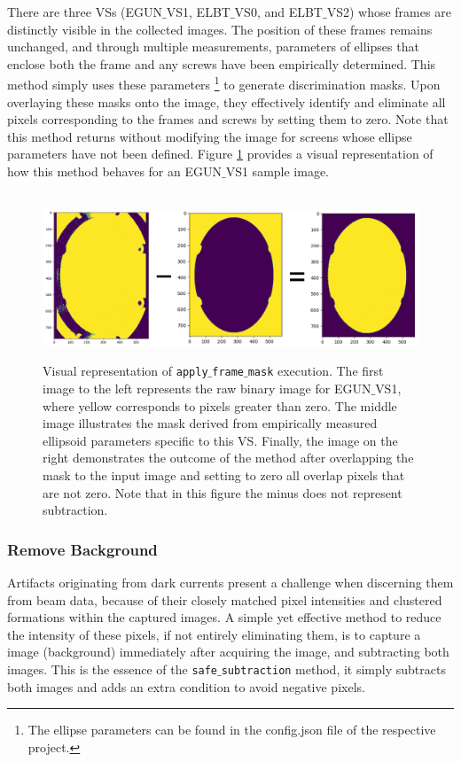 \documentclass{article}
\begin{document}
There are three VSs (EGUN$\_$VS1, ELBT$\_$VS0, and ELBT$\_$VS2) whose frames are distinctly visible in the collected images. The position of these frames remains unchanged, and through multiple measurements, parameters of ellipses that enclose both the frame and any screws have been empirically determined. This method simply uses these parameters \footnote{The ellipse parameters can be found in the config.json file of the respective project.} to generate discrimination masks. Upon overlaying these masks onto the image, they effectively identify and eliminate all pixels corresponding to the frames and screws by setting them to zero. Note that this method returns without modifying the image for screens whose ellipse parameters have not been defined. Figure \ref{fig:9} provides a visual representation of how this method behaves for an EGUN$\_$VS1 sample image.
    
\begin{figure}[!h]  
    \centerline{\ \includegraphics[width=\linewidth]{images/first_step.png}}
    \caption{Visual representation of \texttt{apply$\_$frame$\_$mask} execution. The first image to the left represents the raw binary image for EGUN$\_$VS1, where yellow corresponds to pixels greater than zero. The middle image illustrates the mask derived from empirically measured ellipsoid parameters specific to this VS. Finally, the image on the right demonstrates the outcome of the method after overlapping the mask to the input image and setting to zero all overlap pixels that are not zero. Note that in this figure the minus does not represent subtraction.}
    \label{fig:9}
\end{figure} 

\newpage
\subsubsection{Remove Background}

Artifacts originating from dark currents present a challenge when discerning them from beam data, because of their closely matched pixel intensities and clustered formations within the captured images. A simple yet effective method to reduce the intensity of these pixels, if not entirely eliminating them, is to capture a  image (background) immediately after acquiring the  image, and subtracting both images. This is the essence of the \texttt{safe$\_$subtraction} method, it simply subtracts both images and adds an extra condition to avoid negative pixels.
\end{document}
